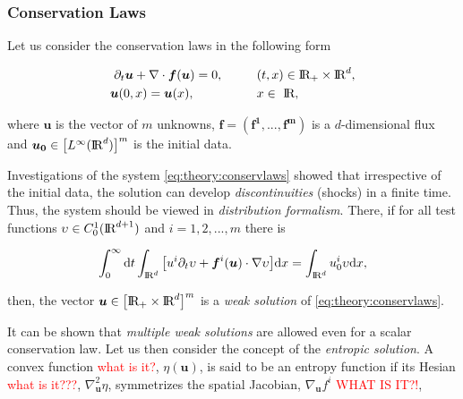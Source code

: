 \subsubsection{Conservation Laws}


Let us consider the conservation laws in the following form

\begin{align}
\partial_t\boldsymbol{u} + \nabla\cdot\boldsymbol{f}(\boldsymbol{u}) = 0, \hspace{10mm} &(t,x)\in \text{I\!R}_{+}\times\text{I\!R}^d , \\
\boldsymbol{u}(0, x) = \boldsymbol{u}(x), \hspace{18mm} &x\in \text{ I\!R},
\label{eq:theory:conservlaws}
\end{align}

where $\boldsymbol{u}$ is the vector of $m$ unknowns, $\boldsymbol{f}=(\boldsymbol{\boldsymbol{f}^1,...,\boldsymbol{f}^m})$ is a $d$-dimensional flux and $\boldsymbol{u_0}\in\big[L^{\infty}(\text{I\!R}^d)\big]^m$ is the initial data. 

Investigations of the system \ref{eq:theory:conservlaws} showed that irrespective of the initial data, the solution can develop \textit{discontinuities} (shocks) in a finite time. 
Thus, the system should be viewed in \textit{distribution formalism}. 
There, if for all test functions $\upsilon\in C_0 ^1 (\text{I\!R}^{d+1})$ and $i=1,2,...,m$  there is

\begin{equation}
\int_{0}^{\infty}\text{d}t\int_{\text{I\!R}^d}\big[u^i \partial_t\upsilon + \boldsymbol{f}^i(\boldsymbol{u})\cdot\nabla\upsilon\big]\text{d}x = \int_{\text{I\!R}^d} u_0 ^i \upsilon \text{d}x,
\end{equation}

then, the vector $\boldsymbol{u}\in\big[\text{I\!R}_{+}\times\text{I\!R}^d\big]^m$ is a \textit{weak solution} of \ref{eq:theory:conservlaws}.

It can be shown that \textit{multiple weak solutions} are allowed even for a scalar conservation law. 
Let us then consider the concept of the \textit{entropic solution}. 
A convex function \textcolor{red}{what is it?}, $\eta(\boldsymbol{u})$, is said to be an entropy function if its Hesian \textcolor{red}{what is it???}, $\nabla_{\boldsymbol{u}}^2\eta$, symmetrizes the spatial Jacobian, $\nabla_{\boldsymbol{u}}f^i$ \textcolor{red}{WHAT IS IT?!},

